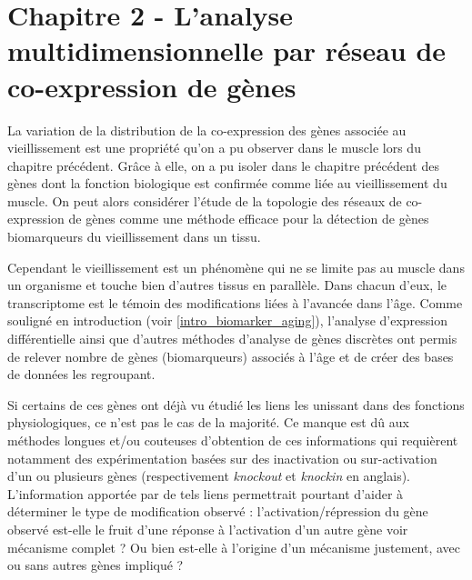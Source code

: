 \chapter{Chapitre 2 - L'analyse multidimensionnelle par réseau de co-expression de gènes}
\label{chapter:multidim}

La variation de la distribution de la co-expression des gènes associée au vieillissement est une propriété qu'on a pu observer dans le muscle lors du chapitre précédent. Grâce à elle, on a pu isoler dans le chapitre précédent des gènes dont la fonction biologique est confirmée comme liée au vieillissement du muscle. On peut alors considérer l'étude de la topologie des réseaux de co-expression de gènes comme une méthode efficace pour la détection de gènes biomarqueurs du vieillissement dans un tissu. 

Cependant le vieillissement est un phénomène qui ne se limite pas au muscle dans un organisme et touche bien d'autres tissus en parallèle. Dans chacun d'eux, le transcriptome est le témoin des modifications liées à l'avancée dans l'âge. Comme souligné en introduction (voir \ref{intro_biomarker_aging}), l'analyse d'expression différentielle ainsi que d'autres méthodes d'analyse de gènes discrètes \cite{Barabasi2004} ont permis de relever nombre de gènes (biomarqueurs) associés à l'âge et de créer des bases de données les regroupant. 

Si certains de ces gènes ont déjà vu étudié les liens les unissant dans des fonctions physiologiques, ce n'est pas le cas de la majorité. Ce manque est dû aux méthodes longues et/ou couteuses d'obtention de ces informations qui requièrent notamment des expérimentation basées sur des inactivation ou sur-activation  d'un ou plusieurs gènes (respectivement \textit{knockout} et \textit{knockin} en anglais). 
L'information apportée par de tels liens permettrait pourtant d'aider à déterminer le type de modification observé \cite{Lopez-Otin2013} : l'activation/répression du gène observé est-elle le fruit d'une réponse à l'activation d'un autre gène voir mécanisme complet ? Ou bien est-elle à l'origine d'un mécanisme justement, avec ou sans autres gènes impliqué ? 

